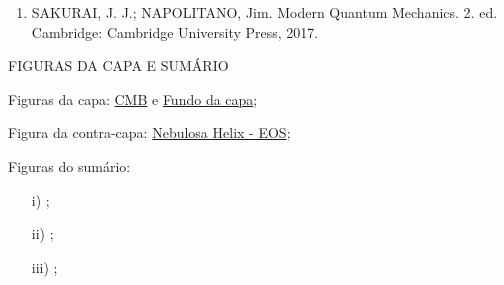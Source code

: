 \begin{enumerate}
    \item \label{ref1:artigo3} SAKURAI, J. J.; NAPOLITANO, Jim. Modern Quantum Mechanics. 2. ed. Cambridge: Cambridge University Press, 2017.
\end{enumerate}


\begin{center}
    \textcolor{base}{\MakeUppercase{Figuras da Capa e Sumário}}
\end{center}

Figuras da capa: \href{https://www.britannica.com/science/cosmic-microwave-background}{CMB} e \href{https://www.canva.com/}{Fundo da capa};

Figura da contra-capa: \href{https://www.eso.org/public/images/eso1205a/}{Nebulosa Helix - EOS};

Figuras do sumário:

\begin{itemize}
    \item[i)] \href{https://pt.wikipedia.org/wiki/Steamboat_Willie}{\titleone};
    \item[ii)] \href{https://br.pinterest.com/}{\titletwo};
    \item[iii)] \href{https://br.pinterest.com/}{\titlethree};
\end{itemize}





